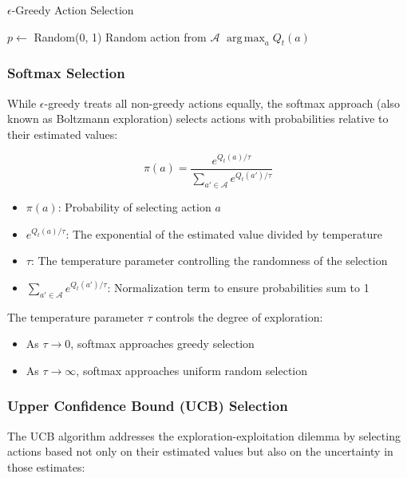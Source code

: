 \documentclass{article}
\DeclareMathOperator*{\argmax}{arg\,max}
\begin{document}
\begin{algorithm}
\caption{$\epsilon$-Greedy Action Selection}
\begin{algorithmic}[1]
    \State $p \gets$ Random(0, 1)
        \State \Return Random action from $\mathcal{A}$
    \Else
        \State \Return $\argmax_a Q_t(a)$
    \EndIf
\EndProcedure
\end{algorithmic}
\end{algorithm}

\subsubsection{Softmax Selection}
While $\epsilon$-greedy treats all non-greedy actions equally, the softmax approach (also known as Boltzmann exploration) selects actions with probabilities relative to their estimated values:

\begin{equation}
    \pi(a) = \frac{e^{Q_t(a)/\tau}}{\sum_{a' \in \mathcal{A}} e^{Q_t(a')/\tau}}
\end{equation}

\begin{tcolorbox}[colback=blue!5!white,colframe=blue!75!black,title=Notation Overview]
\begin{itemize}
    \item $\pi(a)$: Probability of selecting action $a$
    \item $e^{Q_t(a)/\tau}$: The exponential of the estimated value divided by temperature
    \item $\tau$: The temperature parameter controlling the randomness of the selection
    \item $\sum_{a' \in \mathcal{A}} e^{Q_t(a')/\tau}$: Normalization term to ensure probabilities sum to 1
\end{itemize}
\end{tcolorbox}

The temperature parameter $\tau$ controls the degree of exploration:
\begin{itemize}
    \item As $\tau \rightarrow 0$, softmax approaches greedy selection
    \item As $\tau \rightarrow \infty$, softmax approaches uniform random selection
\end{itemize}

\subsubsection{Upper Confidence Bound (UCB) Selection}
The UCB algorithm addresses the exploration-exploitation dilemma by selecting actions based not only on their estimated values but also on the uncertainty in those estimates:
\end{document}
